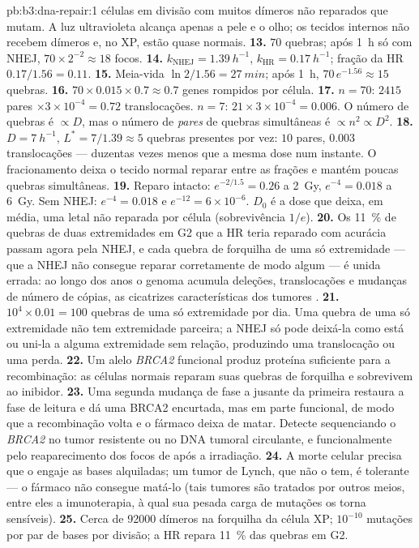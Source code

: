 \begin{solution}{pb:b3:dna-repair:1}
células em divisão com muitos dímeros não reparados que mutam. A luz
ultravioleta alcança apenas a pele e o olho; os tecidos internos não
recebem dímeros e, no XP, estão quase normais.
\textbf{13.} $70$ quebras; após \qty{1}{h} só com NHEJ, $70\times
2^{-2} \approx 18$ focos.
\textbf{14.} $k_{\text{NHEJ}} = \qty{1.39}{h^{-1}}$, $k_{\text{HR}} =
\qty{0.17}{h^{-1}}$; fração da HR $0.17/1.56 = 0.11$.
\textbf{15.} Meia-vida $\ln 2/1.56 = \qty{27}{min}$; após \qty{1}{h},
$70\,e^{-1.56} \approx 15$ quebras.
\textbf{16.} $70\times 0.015\times 0.7 \approx 0.7$ genes rompidos por
célula.
\textbf{17.} $n = 70$: $2415$ pares $\times 3\times 10^{-4} = 0.72$
translocações. $n = 7$: $21\times 3\times 10^{-4} = 0.006$. O número de
quebras é $\propto D$, mas o número de \emph{pares} de quebras
simultâneas é $\propto n^{2} \propto D^{2}$.
\textbf{18.} $D = \qty{7}{h^{-1}}$, $L^{*} = 7/1.39 \approx 5$ quebras
presentes por vez: $10$ pares, $0.003$ translocações --- duzentas vezes
menos que a mesma dose num instante. O fracionamento deixa o tecido
normal reparar entre as frações e mantém poucas quebras simultâneas.
\textbf{19.} Reparo intacto: $e^{-2/1.5} = 0.26$ a \qty{2}{Gy},
$e^{-4} = 0.018$ a \qty{6}{Gy}. Sem NHEJ: $e^{-4} = 0.018$ e
$e^{-12} = 6\times 10^{-6}$. $D_{0}$ é a dose que deixa, em média, uma
 letal não reparada por célula (sobrevivência $1/e$).
\textbf{20.} Os \qty{11}{\%} de quebras de duas extremidades em G2 que
a HR teria reparado com acurácia passam agora pela NHEJ, e cada quebra
de forquilha de uma só extremidade --- que a NHEJ não consegue reparar
corretamente de modo algum --- é unida errada: ao longo dos anos o
genoma acumula deleções, translocações e mudanças de número de cópias,
as cicatrizes características dos tumores \emph{}.
\textbf{21.} $10^{4}\times 0.01 = 100$ quebras de uma só extremidade
por dia. Uma quebra de uma só extremidade não tem extremidade parceira;
a NHEJ só pode deixá-la como está ou uni-la a alguma extremidade sem
relação, produzindo uma translocação ou uma perda.
\textbf{22.} Um alelo \emph{BRCA2} funcional produz proteína suficiente
para a recombinação: as células normais reparam suas quebras de
forquilha e sobrevivem ao inibidor.
\textbf{23.} Uma segunda mudança de fase a jusante da primeira restaura
a fase de leitura e dá uma BRCA2 encurtada, mas em parte funcional, de
modo que a recombinação volta e o fármaco deixa de matar. Detecte
sequenciando o \emph{BRCA2} no tumor resistente ou no DNA tumoral
circulante, e funcionalmente pelo reaparecimento dos focos de 
após a irradiação.
\textbf{24.} A morte celular precisa que o 
engaje as bases alquiladas; um tumor de Lynch, que não o tem, é
tolerante --- o fármaco não consegue matá-lo (tais tumores são tratados
por outros meios, entre eles a imunoterapia, à qual sua pesada carga de
mutações os torna sensíveis).
\textbf{25.} Cerca de \num{92000} dímeros na forquilha da célula XP;
$10^{-10}$ mutações por par de bases por divisão; a HR repara
\qty{11}{\%} das quebras em G2.
\end{solution}
